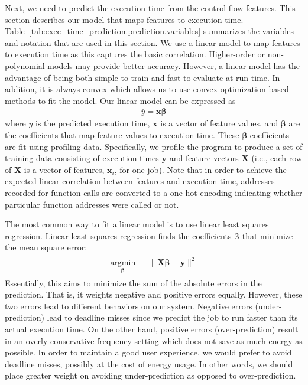 Next, we need to predict the execution time from the control flow features.
This section describes our model that maps features to execution time.
Table~\ref{tab:exec_time_prediction.prediction.variables} summarizes the
variables and notation that are used in this section.  We use a linear model to
map features to execution time as this captures the basic correlation.
Higher-order or non-polynomial models may provide better accuracy.  However, a
linear model has the advantage of being both simple to train and fast to
evaluate at run-time. In addition, it is always convex which allows us to use
convex optimization-based methods to fit the model.  Our linear model can be
expressed as
\begin{align*}
  \bar{y} = \mathbf{x} \boldsymbol{\beta}
\end{align*}
where $\bar{y}$ is the predicted execution time, $\mathbf{x}$ is a vector of
feature values, and $\boldsymbol{\beta}$ are the coefficients that map feature
values to execution time. These $\boldsymbol{\beta}$ coefficients are fit using
profiling data. Specifically, we profile the program to produce a set of
training data consisting of execution times $\mathbf{y}$ and feature vectors
$\mathbf{X}$ (i.e., each row of $\mathbf{X}$ is a vector of features,
$\mathbf{x}_i$, for one job). Note that in order to achieve the expected linear
correlation between features and execution time, addresses recorded for
function calls are converted to a one-hot encoding indicating whether
particular function addresses were called or not.

The most common way to fit a linear model is to use linear least squares
regression.  Linear least squares regression finds the coefficients
$\boldsymbol{\beta}$ that minimize the mean square error:
\begin{align*}
\begin{aligned}
  \underset{\boldsymbol{\beta}}{\text{argmin}} & & \|\mathbf{X}\boldsymbol{\beta} - \textbf{y}\|^2
\end{aligned}
\end{align*}
Essentially, this aims to minimize the sum of the absolute errors in the
prediction. That is, it weights negative and positive errors equally. However,
these two errors lead to different behaviors on our system.  Negative errors
(under-prediction) lead to deadline misses since we predict the job to run
faster than its actual execution time. On the other hand, positive errors
(over-prediction) result in an overly conservative frequency setting which does
not save as much energy as possible. In order to maintain a good user
experience, we would prefer to avoid deadline misses, possibly at the cost of
energy usage. In other words, we should place greater weight on avoiding
under-prediction as opposed to over-prediction.

